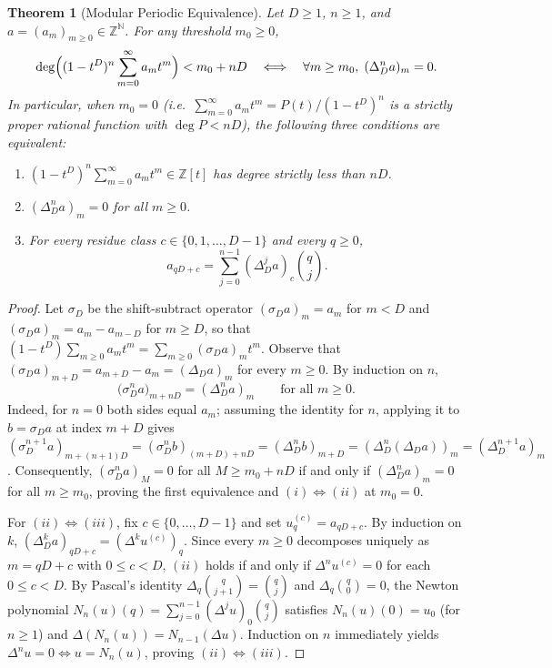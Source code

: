 \documentclass[11pt]{article}
\newtheorem{theorem}{Theorem}[section]
\theoremstyle{definition}
\theoremstyle{remark}
\begin{document}
\begin{theorem}[Modular Periodic Equivalence]
\label{thm:mod-periodic}
Let $D \ge 1$, $n \ge 1$, and $a = (a_m)_{m \ge 0} \in \mathbb{Z}^{\mathbb{N}}$. For any threshold $m_0 \ge 0$,
\[
\deg\Bigl((1 - t^D)^n \sum_{m=0}^{\infty} a_m t^m\Bigr) < m_0 + nD \quad \Longleftrightarrow \quad \forall m \ge m_0,\; (\Delta_D^n a)_m = 0.
\]
In particular, when $m_0 = 0$ (i.e.\ $\sum_{m=0}^{\infty} a_m t^m = P(t)/(1 - t^D)^n$ is a strictly proper rational function with $\deg P < nD$), the following three conditions are equivalent:
\begin{enumerate}
\item[(i)] $(1 - t^D)^n \sum_{m=0}^{\infty} a_m t^m \in \mathbb{Z}[t]$ has degree strictly less than $nD$.
\item[(ii)] $(\Delta_D^n a)_m = 0$ for all $m \ge 0$.
\item[(iii)] For every residue class $c \in \{0,1,\dots,D-1\}$ and every $q \ge 0$,
\[
a_{qD + c} = \sum_{j=0}^{n-1} (\Delta_D^j a)_c \binom{q}{j}.
\]
\end{enumerate}
\end{theorem}

\begin{proof}
Let $\sigma_D$ be the shift-subtract operator $(\sigma_D a)_m = a_m$ for $m < D$ and $(\sigma_D a)_m = a_m - a_{m-D}$ for $m \ge D$, so that $(1 - t^D) \sum_{m \ge 0} a_m t^m = \sum_{m \ge 0} (\sigma_D a)_m t^m$. Observe that $(\sigma_D a)_{m+D} = a_{m+D} - a_m = (\Delta_D a)_m$ for every $m \ge 0$. By induction on $n$,
\[
\bigl(\sigma_D^n a\bigr)_{m + nD} = (\Delta_D^n a)_m \qquad \text{for all } m \ge 0.
\]
Indeed, for $n = 0$ both sides equal $a_m$; assuming the identity for $n$, applying it to $b = \sigma_D a$ at index $m + D$ gives $(\sigma_D^{n+1} a)_{m + (n+1)D} = (\sigma_D^n b)_{(m+D)+nD} = (\Delta_D^n b)_{m+D} = (\Delta_D^n (\Delta_D a))_m = (\Delta_D^{n+1} a)_m$. Consequently, $(\sigma_D^n a)_M = 0$ for all $M \ge m_0 + nD$ if and only if $(\Delta_D^n a)_m = 0$ for all $m \ge m_0$, proving the first equivalence and $(i) \Leftrightarrow (ii)$ at $m_0 = 0$.

For $(ii) \Leftrightarrow (iii)$, fix $c \in \{0,\dots,D-1\}$ and set $u^{(c)}_q = a_{qD+c}$. By induction on $k$, $(\Delta_D^k a)_{qD+c} = (\Delta^k u^{(c)})_q$. Since every $m \ge 0$ decomposes uniquely as $m = qD + c$ with $0 \le c < D$, $(ii)$ holds if and only if $\Delta^n u^{(c)} = 0$ for each $0 \le c < D$. By Pascal's identity $\Delta_q \binom{q}{j+1} = \binom{q}{j}$ and $\Delta_q \binom{q}{0} = 0$, the Newton polynomial $N_n(u)(q) = \sum_{j=0}^{n-1} (\Delta^j u)_0 \binom{q}{j}$ satisfies $N_n(u)(0) = u_0$ (for $n \ge 1$) and $\Delta(N_{n}(u)) = N_{n-1}(\Delta u)$. Induction on $n$ immediately yields $\Delta^n u = 0 \iff u = N_n(u)$, proving $(ii) \Leftrightarrow (iii)$.
\end{proof}
\end{document}
